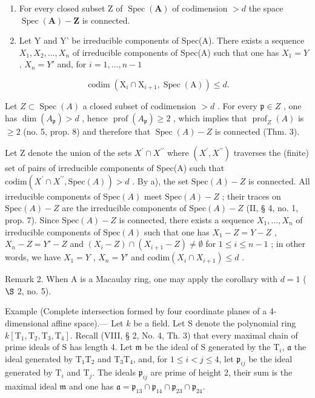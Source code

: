 \begin{enumerate}
\def\labelenumi{\alph{enumi})}
\item
  For every closed subset Z of \(\operatorname{Spec}(\mathbf{A})\) of codimension \(>d\) the space \(\operatorname{Spec}(\mathbf{A}) - \mathbf{Z}\) is connected.
\item
  Let Y and Y' be irreducible components of Spec(A). There exists a sequence \(X_{1}, X_{2}, \ldots, X_{n}\) of irreducible components of Spec(A) such that one has \(X_{1} = Y\) , \(X_{n} = Y'\) and, for \(i = 1, \ldots, n - 1\)
\end{enumerate}

\[
\operatorname{codim} \left(\mathrm{X} _ {i} \cap \mathrm{X} _ {i + 1}, \operatorname{Spec} (\mathrm{A})\right) \leqslant d.
\]

Let \(Z \subset \operatorname{Spec}(A)\) a closed subset of codimension \(>d\) . For every \(\mathfrak{p} \in Z\) , one has \(\dim(A_{\mathfrak{p}}) > d\) , hence \(\operatorname{prof}(A_{\mathfrak{p}}) \geqslant 2\) , which implies that \(\operatorname{prof}_{Z}(A)\) is \(\geqslant 2\) (no. 5, prop. 8) and therefore that \(\operatorname{Spec}(A) - Z\) is connected (Thm. 3).

Let Z denote the union of the sets \(X^{\prime} \cap X^{\prime\prime}\) where \((X^{\prime}, X^{\prime\prime})\) traverses the (finite) set of pairs of irreducible components of Spec(A) such that \(\text{codim}(X^{\prime} \cap X^{\prime\prime}, \text{Spec}(A)) > d\) . By a), the set \(\text{Spec}(A) - Z\) is connected. All irreducible components of \(\text{Spec}(A)\) meet \(\text{Spec}(A) - Z\) ; their traces on \(\text{Spec}(A) - Z\) are the irreducible components of \(\text{Spec}(A) - Z\) (II, § 4, no. 1, prop. 7). Since \(\text{Spec}(A) - Z\) is connected, there exists a sequence \(X_{1}, \ldots, X_{n}\) of irreducible components of \(\text{Spec}(A)\) such that one has \(X_{1} - Z = Y - Z\) , \(X_{n} - Z = Y' - Z\) and \((X_{i} - Z) \cap (X_{i+1} - Z) \neq \emptyset\) for \(1 \leqslant i \leqslant n - 1\) ; in other words, we have \(X_{1} = Y\) , \(X_{n} = Y'\) and \(\text{codim}(X_{i} \cap X_{i+1}) \leqslant d\) .

Remark 2. When A is a Macaulay ring, one may apply the corollary with \(d=1\) ( \(\S\) 2, no. 5).

Example (Complete intersection formed by four coordinate planes of a 4-dimensional affine space).--- Let \(k\) be a field. Let S denote the polynomial ring \(k[\mathrm{T}_{1},\mathrm{T}_{2},\mathrm{T}_{3},\mathrm{T}_{4}]\). Recall (VIII, § 2, No. 4, Th. 3) that every maximal chain of prime ideals of S has length 4. Let \(\mathfrak{m}\) be the ideal of S generated by the \(\mathrm{T}_{i}\), \(\mathfrak{a}\) the ideal generated by \(\mathrm{T}_{1}\mathrm{T}_{2}\) and \(\mathrm{T}_{3}\mathrm{T}_{4}\), and, for \(1 \leqslant i < j \leqslant 4\), let \(\mathfrak{p}_{ij}\) be the ideal generated by \(\mathrm{T}_{i}\) and \(\mathrm{T}_{j}\). The ideals \(\mathfrak{p}_{ij}\) are prime of height 2, their sum is the maximal ideal \(\mathfrak{m}\) and one has \(\mathfrak{a} = \mathfrak{p}_{13} \cap \mathfrak{p}_{14} \cap \mathfrak{p}_{23} \cap \mathfrak{p}_{24}\).

